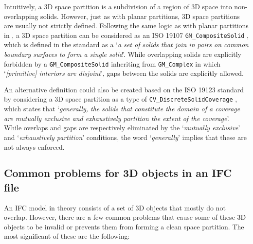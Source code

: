 Intuitively, a 3D space partition is a subdivision of a region of 3D space into non-overlapping solids.
However, just as with planar partitions, 3D space partitions are usually not strictly defined.
Following the same logic as with planar partitions in , a 3D space partition can be considered as an ISO 19107 \texttt{GM\_CompositeSolid} \citep[\S{}6.6.13]{ISO19107:2005}, which is defined in the standard as a `\emph{a set of solids that join in pairs on common boundary surfaces to form a single solid}'.
While overlapping solids are explicitly forbidden by a \texttt{GM\_CompositeSolid} inheriting from \texttt{GM\_Complex} in which `\emph{[primitive] interiors are disjoint}', gaps between the solids are explicitly allowed.

An alternative definition could also be created based on the ISO 19123 standard by considering a 3D space partition as a type of \texttt{CV\_DiscreteSolidCoverage} \citep[\S{}6.10]{ISO19123:2007}, which states that `\emph{generally, the solids that constitute the domain of a coverage are mutually exclusive and exhaustively partition the extent of the coverage}'.
While overlaps and gaps are respectively eliminated by the `\emph{mutually exclusive}' and `\emph{exhaustively partition}' conditions, the word `\emph{generally}' implies that these are not always enforced.

\subsection{Common problems for 3D objects in an IFC file}

An IFC model in theory consists of a set of 3D objects that mostly do not overlap.
However, there are a few common problems that cause some of these 3D objects to be invalid or prevents them from forming a clean space partition.
The most significant of these are the following:

